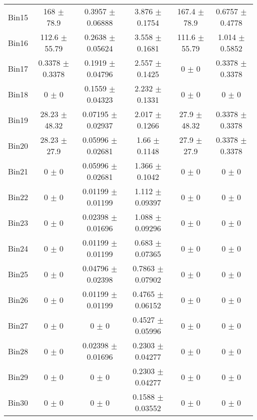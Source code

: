 \begin{tabular}{@{\extracolsep{4pt}}lccccc@{}}
     Bin15 & 168 $\pm$ 78.9 & 0.3957 $\pm$ 0.06888 & 3.876 $\pm$ 0.1754 & 167.4 $\pm$ 78.9 & 0.6757 $\pm$ 0.4778 \\ 
     Bin16 & 112.6 $\pm$ 55.79 & 0.2638 $\pm$ 0.05624 & 3.558 $\pm$ 0.1681 & 111.6 $\pm$ 55.79 & 1.014 $\pm$ 0.5852 \\ 
     Bin17 & 0.3378 $\pm$ 0.3378 & 0.1919 $\pm$ 0.04796 & 2.557 $\pm$ 0.1425 & 0 $\pm$ 0 & 0.3378 $\pm$ 0.3378 \\ 
     Bin18 & 0 $\pm$ 0 & 0.1559 $\pm$ 0.04323 & 2.232 $\pm$ 0.1331 & 0 $\pm$ 0 & 0 $\pm$ 0 \\ 
     Bin19 & 28.23 $\pm$ 48.32 & 0.07195 $\pm$ 0.02937 & 2.017 $\pm$ 0.1266 & 27.9 $\pm$ 48.32 & 0.3378 $\pm$ 0.3378 \\ 
     Bin20 & 28.23 $\pm$ 27.9 & 0.05996 $\pm$ 0.02681 & 1.66 $\pm$ 0.1148 & 27.9 $\pm$ 27.9 & 0.3378 $\pm$ 0.3378 \\ 
     Bin21 & 0 $\pm$ 0 & 0.05996 $\pm$ 0.02681 & 1.366 $\pm$ 0.1042 & 0 $\pm$ 0 & 0 $\pm$ 0 \\ 
     Bin22 & 0 $\pm$ 0 & 0.01199 $\pm$ 0.01199 & 1.112 $\pm$ 0.09397 & 0 $\pm$ 0 & 0 $\pm$ 0 \\ 
     Bin23 & 0 $\pm$ 0 & 0.02398 $\pm$ 0.01696 & 1.088 $\pm$ 0.09296 & 0 $\pm$ 0 & 0 $\pm$ 0 \\ 
     Bin24 & 0 $\pm$ 0 & 0.01199 $\pm$ 0.01199 & 0.683 $\pm$ 0.07365 & 0 $\pm$ 0 & 0 $\pm$ 0 \\ 
     Bin25 & 0 $\pm$ 0 & 0.04796 $\pm$ 0.02398 & 0.7863 $\pm$ 0.07902 & 0 $\pm$ 0 & 0 $\pm$ 0 \\ 
     Bin26 & 0 $\pm$ 0 & 0.01199 $\pm$ 0.01199 & 0.4765 $\pm$ 0.06152 & 0 $\pm$ 0 & 0 $\pm$ 0 \\ 
     Bin27 & 0 $\pm$ 0 & 0 $\pm$ 0 & 0.4527 $\pm$ 0.05996 & 0 $\pm$ 0 & 0 $\pm$ 0 \\ 
     Bin28 & 0 $\pm$ 0 & 0.02398 $\pm$ 0.01696 & 0.2303 $\pm$ 0.04277 & 0 $\pm$ 0 & 0 $\pm$ 0 \\ 
     Bin29 & 0 $\pm$ 0 & 0 $\pm$ 0 & 0.2303 $\pm$ 0.04277 & 0 $\pm$ 0 & 0 $\pm$ 0 \\ 
     Bin30 & 0 $\pm$ 0 & 0 $\pm$ 0 & 0.1588 $\pm$ 0.03552 & 0 $\pm$ 0 & 0 $\pm$ 0 \\ 
\hline\hline
  \end{tabular}
